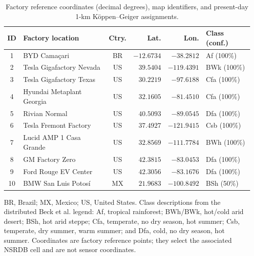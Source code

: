 \begin{table}[!t]
\centering
\caption{Factory reference coordinates (decimal degrees), map identifiers, and
present-day 1-km K\"oppen--Geiger assignments.}
\label{tab:locations}
\scriptsize
\setlength{\tabcolsep}{2.5pt}
\renewcommand{\arraystretch}{1.12}
\begin{tabular*}{\linewidth}{@{\extracolsep{\fill}}clcrrl@{}}
\toprule
\textbf{ID} & \textbf{Factory location} & \textbf{Ctry.} &
\textbf{Lat.} & \textbf{Lon.} & \textbf{Class (conf.)} \\
\midrule
1 & BYD Cama\c{c}ari & BR & $-12.6734$ & $-38.2812$ & Af (100\%) \\
2 & Tesla Gigafactory Nevada & US & $39.5404$ & $-119.4391$ & BWk (100\%) \\
3 & Tesla Gigafactory Texas & US & $30.2219$ & $-97.6188$ & Cfa (100\%) \\
4 & Hyundai Metaplant Georgia & US & $32.1605$ & $-81.4510$ & Cfa (100\%) \\
5 & Rivian Normal & US & $40.5093$ & $-89.0545$ & Dfa (100\%) \\
6 & Tesla Fremont Factory & US & $37.4927$ & $-121.9415$ & Csb (100\%) \\
7 & Lucid AMP 1 Casa Grande & US & $32.8569$ & $-111.7784$ & BWh (100\%) \\
8 & GM Factory Zero & US & $42.3815$ & $-83.0453$ & Dfa (100\%) \\
9 & Ford Rouge EV Center & US & $42.3056$ & $-83.1676$ & Dfa (100\%) \\
10 & BMW San Luis Potos\'i & MX & $21.9683$ & $-100.8492$ & BSh (50\%) \\
\bottomrule
\end{tabular*}

\medskip
\parbox{\linewidth}{\scriptsize
BR, Brazil; MX, Mexico; US, United States. Class descriptions from the
distributed Beck et al. legend: Af, tropical rainforest; BWh/BWk, hot/cold arid
desert; BSh, hot arid steppe; Cfa, temperate, no dry season, hot summer; Csb,
temperate, dry summer, warm summer; and Dfa, cold, no dry season, hot summer.
Coordinates are factory reference points; they select the associated NSRDB
cell and are not sensor coordinates.}
\end{table}
